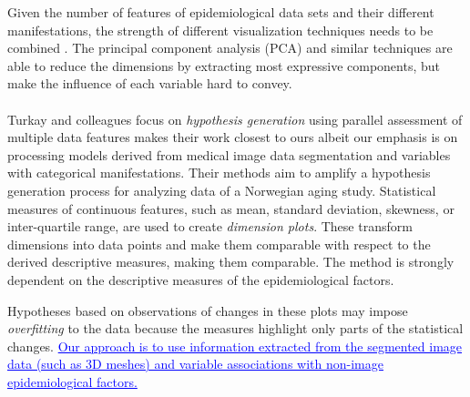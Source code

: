 \documentclass[journal]{style/vgtc} 			          %
\newcommand{\add}[1]{\textcolor{blue}{\uline{#1}}}
\begin{document}
Given the number of features of epidemiological data sets and their different manifestations, the strength of different visualization techniques needs to be combined \cite{Buja91, Konyha2009}.
%
The principal component analysis (PCA) and similar techniques are able to reduce the dimensions by extracting most expressive components, but make the influence of each variable hard to convey.
\\\\
Turkay and colleagues \cite{Turkay2013} focus on \emph{hypothesis generation} using parallel assessment of multiple data features makes their work closest to ours albeit our emphasis is on processing models derived from medical image data segmentation and variables with categorical manifestations.
%
Their methods aim to amplify a hypothesis generation process for analyzing data of a Norwegian aging study.
%
Statistical measures of continuous features, such as mean, standard deviation, skewness, or inter-quartile range, are used to create \emph{dimension plots}. %
%
These transform dimensions into data points and make them comparable with respect to the derived descriptive measures, making them comparable.
%
%
%
%
The method is strongly dependent on the descriptive measures of the epidemiological factors.

Hypotheses based on observations of changes in these plots may impose \emph{overfitting} to the data because the measures highlight only parts of the statistical changes.
%
\add{Our approach is to use information extracted from the segmented image data (such as 3D meshes) and variable associations with non-image epidemiological factors.}
\end{document}
